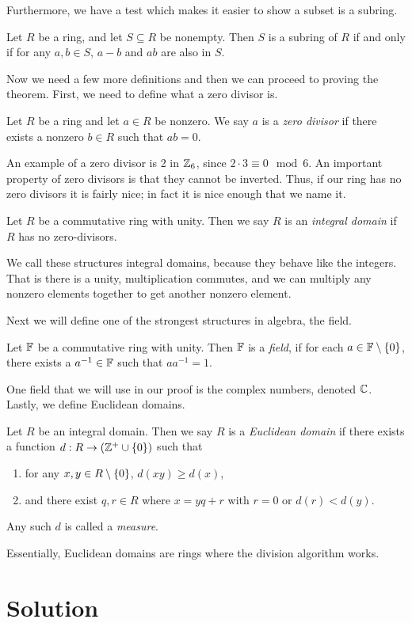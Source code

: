 \documentclass[notitlepage]{simple}
\begin{document}
Furthermore, we have a test which makes it easier to show a subset is a subring.

\begin{proposition}
	Let $R$ be a ring, and let $S\subseteq R$ be nonempty.
	Then $S$ is a subring of $R$ if and only if for any $a,b\in S$, $a-b$ and $ab$ are also in $S$.
\end{proposition}

Now we need a few more definitions and then we can proceed to proving the theorem.
First, we need to define what a zero divisor is.

\begin{definition}
	Let $R$ be a ring and let $a\in R$ be nonzero.
	We say $a$ is a \textit{zero divisor} if there exists a nonzero $b\in R$ such that $ab = 0$.
\end{definition}

An example of a zero divisor is 2 in $\mathbb{Z}_6$, since $2\cdot 3\equiv 0\mod{6}$.
An important property of zero divisors is that they cannot be inverted.
Thus, if our ring has no zero divisors it is fairly nice; in fact it is nice enough that we name it.

\begin{definition}
	Let $R$ be a commutative ring with unity.
	Then we say $R$ is an \textit{integral domain} if $R$ has no zero-divisors.
\end{definition}

We call these structures integral domains, because they behave like the integers.
That is there is a unity, multiplication commutes, and we can multiply any nonzero elements together to get another nonzero element.

Next we will define one of the strongest structures in algebra, the field.

\begin{definition}[Field]
	Let $\mathbb{F}$ be a commutative ring with unity.
	Then $\mathbb{F}$ is a \textit{field}, if for each $a\in\mathbb{F}\setminus\lbrace 0 \rbrace$, there exists a $a^{-1}\in\mathbb{F}$ such that $aa^{-1}=1$.
\end{definition}

One field that we will use in our proof is the complex numbers, denoted $\mathbb{C}$.
Lastly, we define Euclidean domains.

\begin{definition}
	Let $R$ be an integral domain.
	Then we say $R$ is a \textit{Euclidean domain} if there exists a function $d:R\rightarrow(\mathbb{Z}^+\cup\lbrace 0 \rbrace)$ such that
	\begin{enumerate}
		\item for any $x,y\in R\setminus\lbrace 0 \rbrace$, $d(xy)\geq d(x)$,
		\item and there exist $q,r\in R$ where $x=yq+r$ with $r=0$ or $d(r) < d(y)$.
	\end{enumerate}
	Any such $d$ is called a \textit{measure}.
\end{definition}
Essentially, Euclidean domains are rings where the division algorithm works.

\section{Solution}
\end{document}

